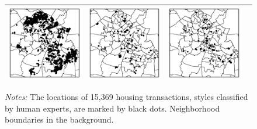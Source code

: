 \documentclass[]{article}
\begin{document}
\begin{figure}[ht]
\begin{tabular}{cccc}
  \includegraphics[width=1.3in]{figures/e postwar.pdf} & \includegraphics[width=1.3in]{figures/f contemporary.pdf} & \includegraphics[width=1.3in]{figures/g cont victorian.pdf}  \\
\bottomrule
\end{tabular}
\begin{minipage}{\textwidth}
\vspace{0.25cm}
\footnotesize \emph{Notes:} The locations of 15,369 housing transactions, styles classified by human experts, are marked by black dots. Neighborhood boundaries in the background. 
\end{minipage}
\end{figure}


\newpage
\end{document}
